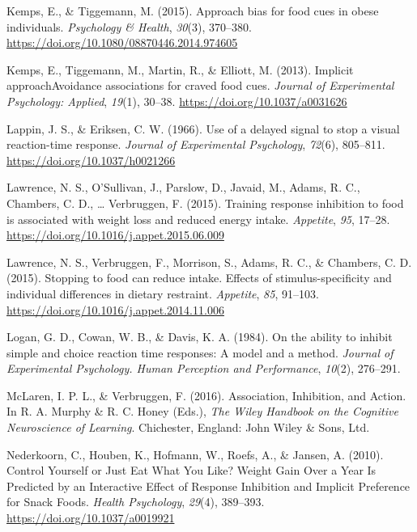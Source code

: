 \documentclass[man]{apa6}
\begin{document}
\leavevmode\hypertarget{ref-kemps_approach_2015}{}%
Kemps, E., \& Tiggemann, M. (2015). Approach bias for food cues in obese individuals. \emph{Psychology \& Health}, \emph{30}(3), 370--380. \url{https://doi.org/10.1080/08870446.2014.974605}

\leavevmode\hypertarget{ref-kemps_implicit_2013}{}%
Kemps, E., Tiggemann, M., Martin, R., \& Elliott, M. (2013). Implicit approachAvoidance associations for craved food cues. \emph{Journal of Experimental Psychology: Applied}, \emph{19}(1), 30--38. \url{https://doi.org/10.1037/a0031626}

\leavevmode\hypertarget{ref-lappinUseDelayedSignal1966}{}%
Lappin, J. S., \& Eriksen, C. W. (1966). Use of a delayed signal to stop a visual reaction-time response. \emph{Journal of Experimental Psychology}, \emph{72}(6), 805--811. \url{https://doi.org/10.1037/h0021266}

\leavevmode\hypertarget{ref-lawrence_training_2015}{}%
Lawrence, N. S., O'Sullivan, J., Parslow, D., Javaid, M., Adams, R. C., Chambers, C. D., \ldots{} Verbruggen, F. (2015). Training response inhibition to food is associated with weight loss and reduced energy intake. \emph{Appetite}, \emph{95}, 17--28. \url{https://doi.org/10.1016/j.appet.2015.06.009}

\leavevmode\hypertarget{ref-lawrence_stopping_2015}{}%
Lawrence, N. S., Verbruggen, F., Morrison, S., Adams, R. C., \& Chambers, C. D. (2015). Stopping to food can reduce intake. Effects of stimulus-specificity and individual differences in dietary restraint. \emph{Appetite}, \emph{85}, 91--103. \url{https://doi.org/10.1016/j.appet.2014.11.006}

\leavevmode\hypertarget{ref-loganAbilityInhibitSimple1984}{}%
Logan, G. D., Cowan, W. B., \& Davis, K. A. (1984). On the ability to inhibit simple and choice reaction time responses: A model and a method. \emph{Journal of Experimental Psychology. Human Perception and Performance}, \emph{10}(2), 276--291.

\leavevmode\hypertarget{ref-mclaren_association_2016}{}%
McLaren, I. P. L., \& Verbruggen, F. (2016). Association, Inhibition, and Action. In R. A. Murphy \& R. C. Honey (Eds.), \emph{The Wiley Handbook on the Cognitive Neuroscience of Learning}. Chichester, England: John Wiley \& Sons, Ltd.

\leavevmode\hypertarget{ref-nederkoorn_control_2010}{}%
Nederkoorn, C., Houben, K., Hofmann, W., Roefs, A., \& Jansen, A. (2010). Control Yourself or Just Eat What You Like? Weight Gain Over a Year Is Predicted by an Interactive Effect of Response Inhibition and Implicit Preference for Snack Foods. \emph{Health Psychology}, \emph{29}(4), 389--393. \url{https://doi.org/10.1037/a0019921}
\end{document}

